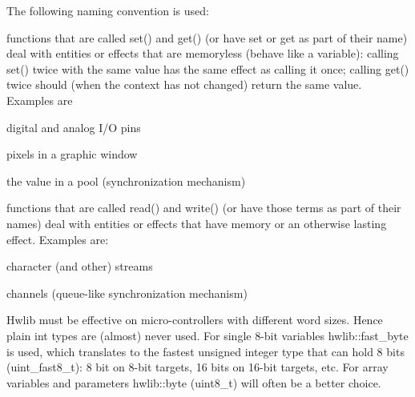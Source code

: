 \begin{DoxyCodeInclude}
\end{DoxyCodeInclude}
 The following naming convention is used\+:
\begin{DoxyItemize}
\item functions that are called set() and get() (or have set or get as part of their name) deal with entities or effects that are memoryless (behave like a variable)\+: calling set() twice with the same value has the same effect as calling it once; calling get() twice should (when the context has not changed) return the same value. Examples are
\begin{DoxyItemize}
\item digital and analog I/O pins
\item pixels in a graphic window
\item the value in a pool (synchronization mechanism)
\end{DoxyItemize}
\item functions that are called read() and write() (or have those terms as part of their names) deal with entities or effects that have memory or an otherwise lasting effect. Examples are\+:
\begin{DoxyItemize}
\item character (and other) streams
\item channels (queue-\/like synchronization mechanism)
\end{DoxyItemize}
\end{DoxyItemize}

Hwlib must be effective on micro-\/controllers with different word sizes. Hence plain int types are (almost) never used. For single 8-\/bit variables hwlib\+::fast\+\_\+byte is used, which translates to the fastest unsigned integer type that can hold 8 bits (uint\+\_\+fast8\+\_\+t)\+: 8 bit on 8-\/bit targets, 16 bits on 16-\/bit targets, etc. For array variables and parameters hwlib\+::byte (uint8\+\_\+t) will often be a better choice.

